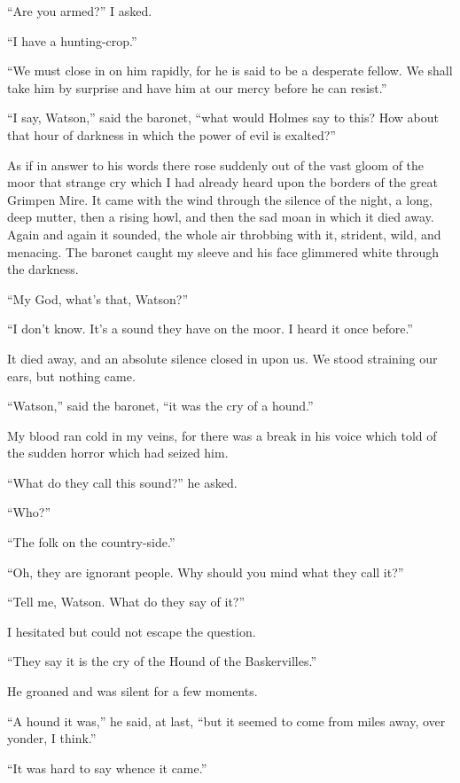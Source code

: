 \documentclass[paper=5.5in:8.5in,BCOR=7mm,twoside,DIV=calc,12pt,usegeometry,openany,chapterprefix,endperiod,headings=big]{scrbook} %
\begin{document}
\enquote{Are you armed?} I asked.

\enquote{I have a hunting-crop.}

\enquote{We must close in on him rapidly, for he is said to be a desperate fellow. We shall take him by surprise and have him at our mercy before he can resist.}

\enquote{I say, Watson,} said the baronet, \enquote{what would Holmes say to this? How about that hour of darkness in which the power of evil is exalted?}

As if in answer to his words there rose suddenly out of the vast gloom of the moor that strange cry which I had already heard upon the borders of the great Grimpen Mire. It came with the wind through the silence of the night, a long, deep mutter, then a rising howl, and then the sad moan in which it died away. Again and again it sounded, the whole air throbbing with it, strident, wild, and menacing. The baronet caught my sleeve and his face glimmered white through the darkness.

\enquote{My God, what's that, Watson?}

\enquote{I don't know. It's a sound they have on the moor. I heard it once before.}

It died away, and an absolute silence closed in upon us. We stood straining our ears, but nothing came.

\enquote{Watson,} said the baronet, \enquote{it was the cry of a hound.}

My blood ran cold in my veins, for there was a break in his voice which told of the sudden horror which had seized him.

\enquote{What do they call this sound?} he asked.

\enquote{Who?}

\enquote{The folk on the country-side.}

\enquote{Oh, they are ignorant people. Why should you mind what they call it?}

\enquote{Tell me, Watson. What do they say of it?}

I hesitated but could not escape the question.

\enquote{They say it is the cry of the Hound of the Baskervilles.}

He groaned and was silent for a few moments.

\enquote{A hound it was,} he said, at last, \enquote{but it seemed to come from miles away, over yonder, I think.}

\enquote{It was hard to say whence it came.}
\end{document}
